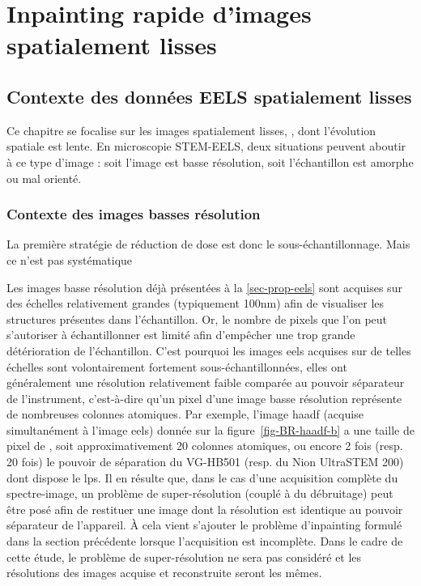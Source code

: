 \chapter{Inpainting rapide d'images spatialement lisses}
\label{ch-chapter_3}
\dochaptoc
%
\section{Contexte des données EELS spatialement lisses}

Ce chapitre se focalise sur les images spatialement lisses, \ie{}, dont l'évolution spatiale est lente. En microscopie STEM-EELS, deux situations peuvent aboutir à ce type d'image : soit l'image est basse résolution, soit l'échantillon est amorphe ou mal orienté.

\subsection{Contexte des images basses résolution}\label{sec-donnees-sous-echantillonnees}

La première stratégie de réduction de dose est donc le sous-échantillonnage. Mais ce n'est pas systématique


Les images basse résolution déjà présentées à la \cref{sec-prop-eels} sont acquises sur des échelles relativement grandes (typiquement 100nm) afin de visualiser les structures présentes dans l'échantillon. 
%
Or, le nombre de pixels que l'on peut s'autoriser à échantillonner est limité afin d'empêcher une trop grande détérioration de l'échantillon. 
%
C'est pourquoi les images \gls{eels} acquises sur de telles échelles sont volontairement fortement sous-échantillonnées, elles ont généralement une résolution relativement faible comparée au pouvoir séparateur de l'instrument, c'est-à-dire qu'un pixel d'une image basse résolution représente de nombreuses colonnes atomiques. 
%
Par exemple, l'image \gls{haadf} (acquise simultanément à l'image \gls{eels}) donnée sur la figure~\ref{fig-BR-haadf-b} a une taille de pixel de , soit approximativement 20 colonnes atomiques, ou encore 2 fois (resp. 20 fois) le pouvoir de séparation du VG-HB501 (resp. du Nion UltraSTEM 200) dont dispose le \gls{lps}.
%
Il en résulte que, dans le cas d'une acquisition complète du spectre-image, un problème de super-résolution (couplé à du débruitage) peut être posé afin de restituer une image dont la résolution est identique au pouvoir séparateur de l'appareil. \`A cela vient s'ajouter le problème d'inpainting formulé dans la section précédente lorsque l'acquisition est incomplète. Dans le cadre de cette étude, le problème de super-résolution ne sera pas considéré et les résolutions des images acquise et reconstruite seront les mêmes.


